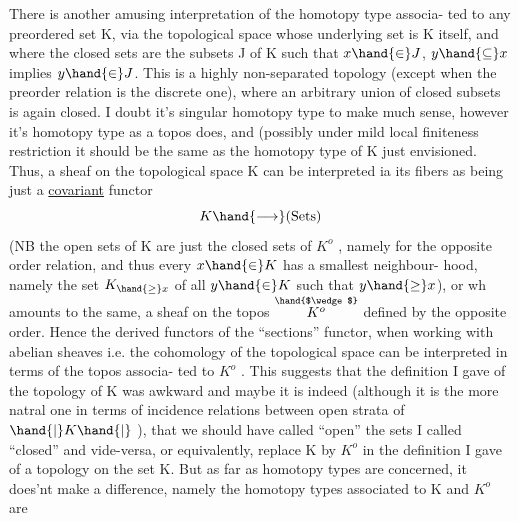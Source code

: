 
There is another amusing interpretation of the homotopy type associa-%
ted to any preordered set K,  via the topological space whose underlying
\margin{$\times$} set is K itself,  and where the closed sets are the subsets J of K
such that  $x \hand{\in} J$,  $y \hand{\subseteq} x$ implies $y \hand{\in} J$.  This is a highly non-separated
topology  (except when the preorder relation is the discrete one),  where
an arbitrary union of closed subsets is again closed.  I doubt it's
singular homotopy type to make much sense,  however it's  homotopy type
as a topos does,  and (possibly under mild loc\unsure{\hand{-}}al finiteness restriction\hand{)}
it should be the same as the homotopy type of K just envisioned.  Thus,
a sheaf on the topological space K   can be interpreted 
ia its fibers as being just a \uline{covariant} functor
\[ K \hand{\longrightarrow} (\text{Sets}) \]
(NB  the open sets of K are just the closed sets of $K^{o}$ , namely for the
opposite order relation,  and thus every $x \hand{\in} K$ has a smallest neighbour-%
hood,  namely the set  $K_{\hand{\geq} x}$  of all $y \hand{\in} K$ such that $y \hand{\geq} x$),  or wh
amounts to the same,  a sheaf on the topos  $\overset{\hand{$\wedge$}}{K^{o}}$  defined by the opposite
order.  Hence the derived functors of the ``sections'' functor,  when
working with abelian sheaves   i.e.  the cohomology of the
topological space  can be interpreted in terms of the topos associa-%
ted to $K^{o}$ .  This suggests that the definition I gave of the topology
of K was awkward and maybe it is indeed (although it is the more natral
one in terms of incidence relations between open strata of $\hand{|}K\hand{|}$ ), that
we should have called ``open'' the sets I called ``closed'' and vide-versa,
or equivalently,  replace K by $K^{o}$ in the definition I gave of a topology
on the set K.  But as far as homotopy types are concerned, it does'nt
make a difference,  namely the homotopy types associated to K and $K^{o}$ are
